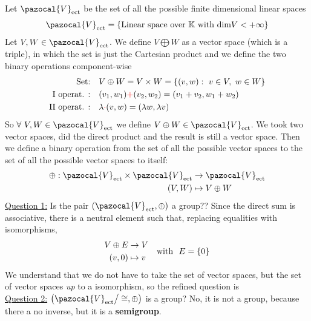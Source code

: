 \documentclass[../main.tex]{subfiles}
\begin{document}
\begin{example}
Let $\pazocal{V}_{\textrm{ect}}$ be the set of all the possible finite dimensional linear spaces
\[
\pazocal{V}_{\textrm{ect}}=\Bqty{\textrm{Linear space over $\mathbb{K}$ with} \ \textrm{dim}V<+\infty}
\]
Let $V,W\in\pazocal{V}_{\textrm{ect}}$. We define $V\bigoplus W$ as a vector space (which is a triple), in which the set is just the Cartesian product and we define the two binary operations component-wise
\[
\begin{split}
    \textrm{Set:} \quad & V\oplus W = V \times W = \Bqty{(v,w): \ v\in V, \ w\in W}\\
    \textrm{I operat. :} \quad & (v_1,w_1) {\color{red}+}(v_2,w_2)=(v_1+v_2,w_1+w_2)\\
    \textrm{II operat. :} \quad &\lambda{\color{red}\cdot}(v,w)=(\lambda w,\lambda v)
\end{split}
\]
So $\forall \ V,W\in\pazocal{V}_{\textrm{ect}}$ we define $V\oplus W\in\pazocal{V}_{\textrm{ect}}$. We took two vector spaces, did the direct product and the result is still a vector space. Then we define a binary operation from the set of all the possible vector spaces to the set of all the possible vector spaces to itself:
\[
\begin{split}
\oplus : \pazocal{V}_{\textrm{ect}}\times \pazocal{V}_{\textrm{ect}}& \to  \pazocal{V}_{\textrm{ect}}\\
(V,W) &\mapsto V\oplus W
\end{split}
\]
\underline{Question 1:} Is the pair $\pqty{\pazocal{V}_{\textrm{ect}}, \oplus}$ a group?? Since the direct sum is associative, there is a neutral element such that, replacing equalities with isomorphisms,
\[
\begin{split}
    V \oplus E &\to V\\
    (v,0) &\mapsto v
\end{split}\quad
\textrm{with } \ E=\Bqty{0}
\]
We understand that we do not have to take the set of vector spaces, but the set of vector spaces \textit{up} to a isomorphism, so the refined question is\\
\underline{Question 2:} $\pqty{\pazocal{V}_{\textrm{ect}}\big/\cong, \oplus}$ is a group? No, it is not a group, because there a no inverse, but it is a \textbf{semigroup}.
\end{example}
\end{document}
